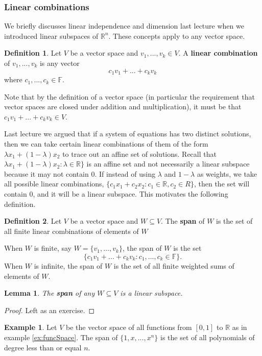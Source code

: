 \documentclass[12pt,reqno]{amsart}
\def\F{\mathbb{F}}
\def\R{\mathbb{R}}
\newtheorem{lemma}{Lemma}[section]
\theoremstyle{definition}
\newtheorem{definition}{Definition}[section]
\newtheorem{example}{Example}[section]
\begin{document}
\subsubsection{Linear combinations}

We briefly discusses linear independence and dimension last lecture
when we introduced linear subspaces of $\R^n$. These concepts apply to
any vector space. 
\begin{definition}
  Let $V$ be a vector space and $v_1,..., v_k \in V$. A \textbf{linear
    combination} of $v_1,..., v_k$ is any vector 
  \[c_1 v_1 + ... + c_k v_k \]
  where $c_1, ..., c_k \in \F$. 
\end{definition}
Note that by the definition of a vector space (in particular the
requirement that vector spaces are closed under addition and
multiplication), it must be that $c_1 v_1 + ... + c_k v_k \in V$.

Last lecture we argued that if a system of equations has two distinct
solutions, then we can take certain linear combinations of them of the
form $\lambda x_1 + (1-\lambda) x_2$ to trace out an affine set
of solutions. Recall that $\lambda x_1 + (1-\lambda) x_2 : \lambda
\in \R\}$ is an affine set and not necessarily a linear subspace because it may
not contain $0$. If instead of using $\lambda$ and $1-\lambda$ as
weights, we take all possible linear combinations, $\{c_1 x_1 + c_2
x_2 : c_1 \in \R, c_2 \in R\}$, then the set will contain $0$, and it
will be a linear subspace. This motivates the following definition.
\begin{definition}
  Let $V$ be a vector space and $W \subseteq V$. The
  \textbf{span} of $W$ is the set
  of all finite linear combinations of elements of $W$
\end{definition}
When $W$ is finite, say $W = \{v_1, ..., v_k\}$, the span of $W$ is
the set 
\[ \{ c_1 v_1 + ... + c_k v_k : c_1, ..., c_k \in \F \}. \] When $W$
is infinite, the span of $W$ is the set of all finite weighted sums of
elements of $W$.
\begin{lemma}
  The \textbf{span} of any  $W \subseteq V$ is a linear subspace.
\end{lemma}
\begin{proof}
  Left as an exercise.
\end{proof}

\begin{example}
  Let $V$ be the vector space of all functions from $[0,1]$ to $\R$ as
  in example \ref{ex:funcSpace}. The span of $\{1, x, ..., x^n\}$ is
  the set of all polynomials of degree less than or equal $n$.
\end{example}
\end{document}

